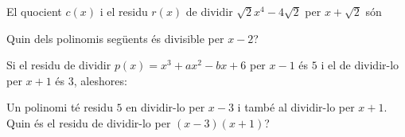 \begin{enumerate}
\begin{enumerate}[label=\alph*)]

\end{enumerate}

\feedback

\pregunta El quocient $c(x)$ i el residu $r(x)$ de dividir $\sqrt{2}x^{4}-4\sqrt{2}$ per $x+\sqrt{2}$ són

\begin{enumerate}[label=\alph*)]





\end{enumerate}

\feedback

\pregunta Quin dels polinomis següents és divisible per $x-2$?

\begin{enumerate}[label=\alph*)]





\end{enumerate}

\feedback

\pregunta Si el residu de dividir $p(x)=x^{3}+ax^{2}-bx+6$ per $x-1$ és $5$ i el
de dividir-lo per $x+1$ és $3$, aleshores:

\begin{enumerate}[label=\alph*)]





\end{enumerate}

\feedback

\pregunta Un polinomi té residu $5$ en dividir-lo per $x-3$ i també al
dividir-lo per $x+1$. Quin és el residu de dividir-lo per $(x-3)(x+1)$?

\begin{enumerate}[label=\alph*)]


\end{enumerate}
\end{enumerate}
